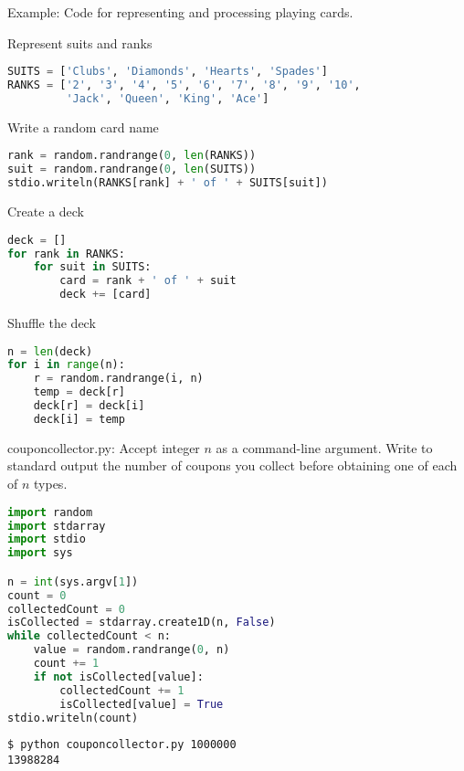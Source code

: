 \documentclass[8pt,a4paper,compress]{beamer}
\begin{document}
\begin{frame}[fragile]
\begin{framed}
\tiny Example: Code for representing and processing playing cards.
\end{framed}

Represent suits and ranks
\begin{lstlisting}[language=Python]
SUITS = ['Clubs', 'Diamonds', 'Hearts', 'Spades']
RANKS = ['2', '3', '4', '5', '6', '7', '8', '9', '10', 
         'Jack', 'Queen', 'King', 'Ace']
\end{lstlisting}

Write a random card name
\begin{lstlisting}[language=Python]
rank = random.randrange(0, len(RANKS))
suit = random.randrange(0, len(SUITS))
stdio.writeln(RANKS[rank] + ' of ' + SUITS[suit])
\end{lstlisting}

Create a deck
\begin{lstlisting}[language=Python]
deck = []
for rank in RANKS:
    for suit in SUITS:
        card = rank + ' of ' + suit
        deck += [card]
\end{lstlisting}

Shuffle the deck
\begin{lstlisting}[language=Python]
n = len(deck)
for i in range(n):
    r = random.randrange(i, n)
    temp = deck[r]
    deck[r] = deck[i]
    deck[i] = temp
\end{lstlisting}
\end{frame}

\begin{frame}[fragile]
\begin{framed}
\tiny couponcollector.py: Accept integer $n$ as a command-line argument. Write to standard output the number of coupons you collect before obtaining one of each of $n$ types.
\end{framed}

\begin{lstlisting}[language=Python]
import random
import stdarray
import stdio
import sys

n = int(sys.argv[1])
count = 0
collectedCount = 0
isCollected = stdarray.create1D(n, False)
while collectedCount < n:
    value = random.randrange(0, n)
    count += 1
    if not isCollected[value]:
        collectedCount += 1
        isCollected[value] = True
stdio.writeln(count)
\end{lstlisting}

\begin{lstlisting}[language={}]
$ python couponcollector.py 1000000
13988284
\end{lstlisting}
\end{frame}
\end{document}
